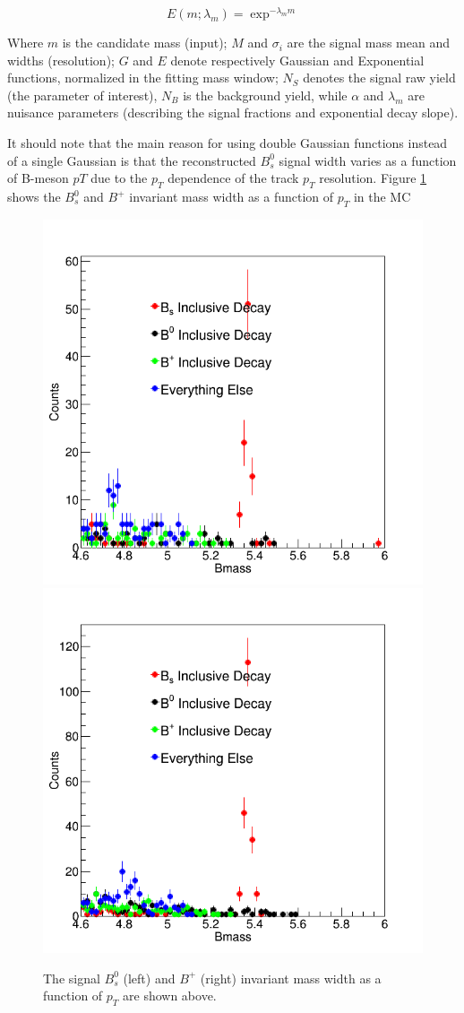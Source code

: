 \begin{equation}
E(m;\lambda_m) = \exp^{-\lambda_m m}
\end{equation}

Where $m$ is the candidate mass (input); $M$ and $\sigma_i$ are the signal mass mean and widths (resolution); $G$ and $E$ denote respectively Gaussian and Exponential functions, normalized in the fitting mass window; $N_S$ denotes the signal raw yield (the parameter of interest),  $N_B$ is the background yield, while $\alpha$ and $\lambda_m$ are nuisance parameters (describing the signal fractions and exponential decay slope). %

It should note that the main reason for using double Gaussian functions instead of a single Gaussian is that the reconstructed $B^0_s$ signal width varies as a function of B-meson $pT$ due to the $p_T$ dependence of the track $p_T$ resolution. Figure \ref{BsBPWidthPT} shows the $B^0_s$ and $B^+$ invariant mass width as a function of $p_T$ in the MC


\begin{figure}[ht!]
\centering
\includegraphics[width=0.45\linewidth]{Figures/Chapter4/BmesonBackground_0.png}
\includegraphics[width=0.45\linewidth]{Figures/Chapter4/BmesonBackground_1.png}
\caption{The signal $B^0_s$ (left) and $B^+$ (right) invariant mass width as a function of $p_T$ are shown above.}
\label{BsBPWidthPT}
\end{figure}


